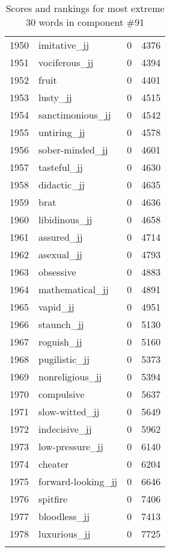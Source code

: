 \begin{longtable}[!htbp]{| rlr@{.}l |}
    1950 & imitative\_jj & 0 & 4376 \\
    1951 & vociferous\_jj & 0 & 4394 \\
    1952 & fruit & 0 & 4401 \\
    1953 & lusty\_jj & 0 & 4515 \\
    1954 & sanctimonious\_jj & 0 & 4542 \\
    1955 & untiring\_jj & 0 & 4578 \\
    1956 & sober-minded\_jj & 0 & 4601 \\
    1957 & tasteful\_jj & 0 & 4630 \\
    1958 & didactic\_jj & 0 & 4635 \\
    1959 & brat & 0 & 4636 \\
    1960 & libidinous\_jj & 0 & 4658 \\
    1961 & assured\_jj & 0 & 4714 \\
    1962 & asexual\_jj & 0 & 4793 \\
    1963 & obsessive & 0 & 4883 \\
    1964 & mathematical\_jj & 0 & 4891 \\
    1965 & vapid\_jj & 0 & 4951 \\
    1966 & staunch\_jj & 0 & 5130 \\
    1967 & roguish\_jj & 0 & 5160 \\
    1968 & pugilistic\_jj & 0 & 5373 \\
    1969 & nonreligious\_jj & 0 & 5394 \\
    1970 & compulsive & 0 & 5637 \\
    1971 & slow-witted\_jj & 0 & 5649 \\
    1972 & indecisive\_jj & 0 & 5962 \\
    1973 & low-pressure\_jj & 0 & 6140 \\
    1974 & cheater & 0 & 6204 \\
    1975 & forward-looking\_jj & 0 & 6646 \\
    1976 & spitfire & 0 & 7406 \\
    1977 & bloodless\_jj & 0 & 7413 \\
    1978 & luxurious\_jj & 0 & 7725 \\
    \hline
    \caption{Scores and rankings for most extreme 30 words in component \#91} \\
\end{longtable}
